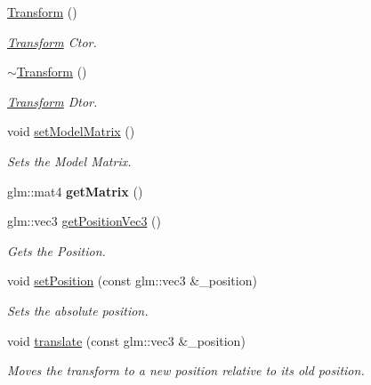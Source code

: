\begin{DoxyCompactItemize}
\item 
\hyperlink{class_cookie_eng_1_1_attribute_1_1_transform_a5937c664923e53ba8168185b1765dcd4}{Transform} ()
\begin{DoxyCompactList}\small\item\em \hyperlink{class_cookie_eng_1_1_attribute_1_1_transform}{Transform} Ctor. \end{DoxyCompactList}\item 
\hyperlink{class_cookie_eng_1_1_attribute_1_1_transform_aecf1ff56f3c0b6e72931c0899b510ad5}{$\sim$\+Transform} ()
\begin{DoxyCompactList}\small\item\em \hyperlink{class_cookie_eng_1_1_attribute_1_1_transform}{Transform} Dtor. \end{DoxyCompactList}\item 
void \hyperlink{class_cookie_eng_1_1_attribute_1_1_transform_a6311fcf34d2a2e2ff47d0e5b851bbff3}{set\+Model\+Matrix} ()
\begin{DoxyCompactList}\small\item\em Sets the Model Matrix. \end{DoxyCompactList}\item 
\mbox{\label{class_cookie_eng_1_1_attribute_1_1_transform_a35425fa9028a916c8032faaaf0163174}} 
glm\+::mat4 {\bfseries get\+Matrix} ()
\item 
glm\+::vec3 \hyperlink{class_cookie_eng_1_1_attribute_1_1_transform_a9229397b6dfbf62b3efc904c34d68815}{get\+Position\+Vec3} ()
\begin{DoxyCompactList}\small\item\em Gets the Position. \end{DoxyCompactList}\item 
void \hyperlink{class_cookie_eng_1_1_attribute_1_1_transform_a797ca3b135ef16b9692afeda0ded859f}{set\+Position} (const glm\+::vec3 \&\+\_\+position)
\begin{DoxyCompactList}\small\item\em Sets the absolute position. \end{DoxyCompactList}\item 
void \hyperlink{class_cookie_eng_1_1_attribute_1_1_transform_af16f4e46d6b42fc869a95e722902682c}{translate} (const glm\+::vec3 \&\+\_\+position)
\begin{DoxyCompactList}\small\item\em Moves the transform to a new position relative to its old position. \end{DoxyCompactList}\item 

\end{DoxyCompactItemize}
